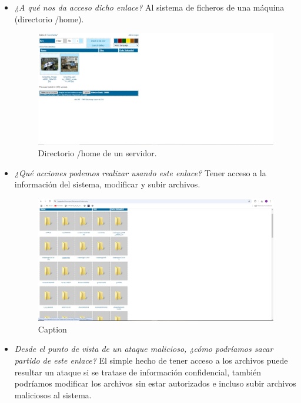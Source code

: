 \documentclass[12pt]{book}
\begin{document}
\begin{itemize}
    \item \textit{¿A qué nos da acceso dicho enlace?}
    \newline
    Al sistema de ficheros de una máquina (directorio /home).
    \begin{figure}[h]
        \centering
        \includegraphics[width=\linewidth]{Practica 3y4/images/WhatsApp Image 2024-10-24 at 10.19.57.jpeg}
        \caption{Directorio /home de un servidor.}
        \label{fig:enter-label}
    \end{figure}
    \item \textit{¿Qué acciones podemos realizar usando este enlace?}
    \newline
    Tener acceso a la información del sistema, modificar y subir archivos.
    \begin{figure}[h]
        \centering
        \includegraphics[width=0.5\linewidth]{Practica 3y4/images/WhatsApp Image 2024-10-24 at 10.20.22.jpeg}
        \caption{Caption}
        \label{fig:enter-label}
    \end{figure}
    \item \textit{Desde el punto de vista de un ataque malicioso, ¿cómo podríamos sacar partido de este enlace?}
    \newline
    El simple hecho de tener acceso a los archivos puede resultar un ataque si se tratase de información confidencial, también podríamos modificar los archivos sin estar autorizados e incluso subir archivos maliciosos al sistema.    
\end{itemize}
\end{document}
